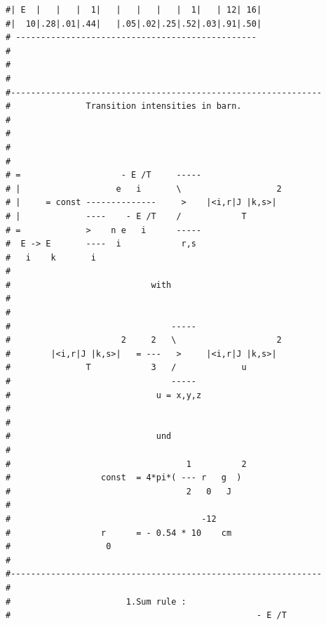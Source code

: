 \begin{enumerate}
{\begin{verbatim}
#| E  |   |   |  1|   |   |   |   |  1|   | 12| 16|
#|  10|.28|.01|.44|   |.05|.02|.25|.52|.03|.91|.50|
# ------------------------------------------------ 
#
#
#
#-------------------------------------------------------------- 
#               Transition intensities in barn.                
#                                                              
#                                                              
#                                                              
#                                                              
# =                    - E /T     -----                        
# |                   e   i       \                   2        
# |     = const --------------     >    |<i,r|J |k,s>|         
# |             ----    - E /T    /            T               
# =             >    n e   i      -----                        
#  E -> E       ----  i            r,s                         
#   i    k       i                                             
#                                                              
#                            with                              
#                                                              
#                                                              
#                                -----                         
#                      2     2   \                    2        
#        |<i,r|J |k,s>|   = ---   >     |<i,r|J |k,s>|         
#               T            3   /             u               
#                                -----                         
#                             u = x,y,z                        
#                                                              
#                                                              
#                             und                              
#                                                              
#                                   1          2               
#                  const  = 4*pi*( --- r   g  )                
#                                   2   0   J                  
#                                                              
#                                      -12                     
#                  r      = - 0.54 * 10    cm                  
#                   0                                          
#                                                              
#--------------------------------------------------------------
#                                                              
#                       1.Sum rule :                           
#                                                 - E /T       

\end{verbatim}}
\end{enumerate}
